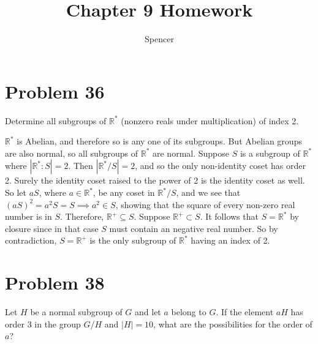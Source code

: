 \documentclass{article}
\title{Chapter 9 Homework}
\author{Spencer}
\begin{document}
\maketitle

%
%
%

\section*{Problem 36}

Determine all subgroups of $\mathbb{R}^*$ (nonzero reals under multiplication) of index 2.

$\mathbb{R}^*$ is Abelian, and therefore so is any one of its subgroups.
But Abelian groups are also normal, so all subgroups of $\mathbb{R}^*$ are normal.
Suppose $S$ is a subgroup of $\mathbb{R}^*$ where $|\mathbb{R}^*:S|=2$.
Then $|\mathbb{R}^*/S|=2$, and so the only non-identity coset has order 2.
Surely the identity coset raised to the power of 2 is the identity coset
as well.  So let $aS$, where $a\in\mathbb{R}^*$, be any coset in
$\mathbb{R}^*/S$, and we see that $(aS)^2=a^2S=S\implies a^2\in S$, showing that
the square of every non-zero real number is in $S$.  Therefore, $\mathbb{R}^+\subseteq S$.
Suppose $\mathbb{R}^+\subset S$.  It follows that $S=\mathbb{R}^*$ by closure since in that case
$S$ must contain an negative real number.  So by contradiction, $S=\mathbb{R}^+$ is
the only subgroup of $\mathbb{R}^*$ having an index of 2.

\section*{Problem 38}

Let $H$ be a normal subgroup of $G$ and let $a$ belong to $G$.
If the element $aH$ has order 3 in the group $G/H$ and $|H|=10$,
what are the possibilities for the order of $a$?
\end{document}
